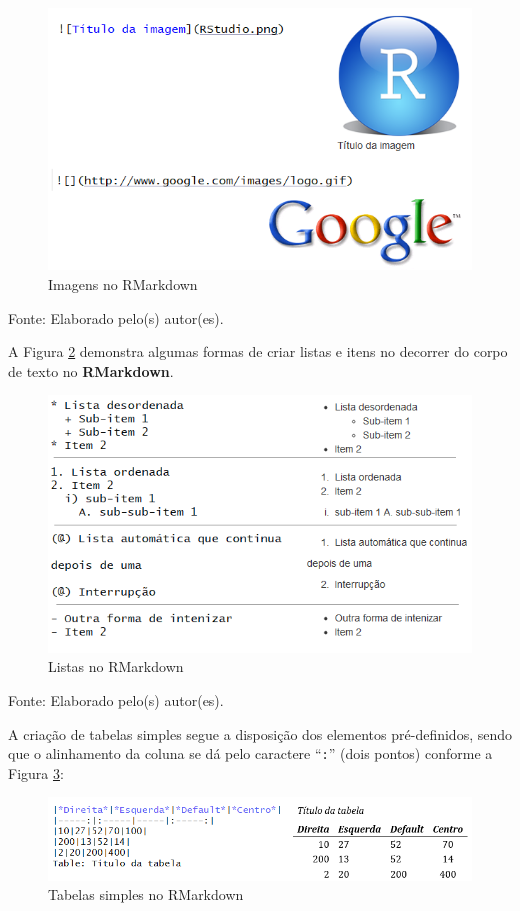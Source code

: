 \documentclass[12pt,brazil,oneside]{book}
\begin{document}
\begin{figure}[H]

{\centering \includegraphics[width=0.6\linewidth]{rmarkimg} 

}

\caption{Imagens no RMarkdown}\label{fig:rmarkimg}
\end{figure}

Fonte: Elaborado pelo(s) autor(es).

A Figura \ref{fig:rmarklist} demonstra algumas formas de criar listas e
itens no decorrer do corpo de texto no \textbf{RMarkdown}.

\begin{figure}[H]

{\centering \includegraphics[width=0.6\linewidth]{rmarklist} 

}

\caption{Listas no RMarkdown}\label{fig:rmarklist}
\end{figure}

Fonte: Elaborado pelo(s) autor(es).

A criação de tabelas simples segue a disposição dos elementos
pré-definidos, sendo que o alinhamento da coluna se dá pelo caractere
``\texttt{:}'' (dois pontos) conforme a Figura \ref{fig:rmarktab}:

\begin{figure}[H]

{\centering \includegraphics[width=0.6\linewidth]{rmarktab} 

}

\caption{Tabelas simples no RMarkdown}\label{fig:rmarktab}
\end{figure}
\end{document}
